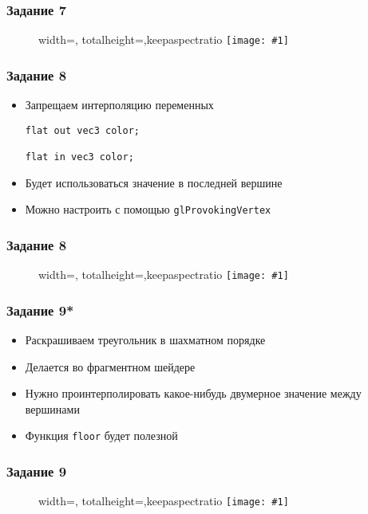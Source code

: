 \documentclass{beamer}
\newcommand{\slideimage}[1]{
  \begin{figure}
    \begin{adjustbox}{width=\textwidth, totalheight=\textheight-2\baselineskip-2\baselineskip,keepaspectratio}
      \texttt{[image: \#1]}
    \end{adjustbox}
  \end{figure}
}
\begin{document}
\begin{frame}[fragile]
\frametitle{Задание 7}
\slideimage{task_7.png}
\end{frame}

\begin{frame}[fragile]
\frametitle{Задание 8}
\begin{itemize}
\item Запрещаем интерполяцию переменных
\pause
\begin{verbatim}
flat out vec3 color;

flat in vec3 color;
\end{verbatim}
\pause
\item Будет использоваться значение в последней вершине
\item Можно настроить с помощью \verb|glProvokingVertex|
\end{itemize}
\end{frame}

\begin{frame}[fragile]
\frametitle{Задание 8}
\slideimage{task_8.png}
\end{frame}

\begin{frame}[fragile]
\frametitle{Задание 9*}
\begin{itemize}
\item Раскрашиваем треугольник в шахматном порядке
\pause
\item Делается во фрагментном шейдере
\pause
\item Нужно проинтерполировать какое-нибудь двумерное значение между вершинами
\pause
\item Функция \verb|floor| будет полезной
\end{itemize}
\end{frame}

\begin{frame}[fragile]
\frametitle{Задание 9}
\slideimage{task_9.png}
\end{frame}
\end{document}
